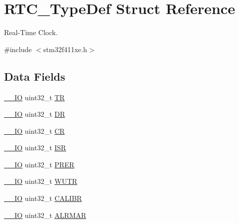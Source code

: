 \hypertarget{struct_r_t_c___type_def}{}\section{R\+T\+C\+\_\+\+Type\+Def Struct Reference}
\label{struct_r_t_c___type_def}


Real-\/\+Time Clock.  




{\ttfamily \#include $<$stm32f411xe.\+h$>$}

\subsection*{Data Fields}
\begin{DoxyCompactItemize}
\item 
\hyperlink{core__sc300_8h_aec43007d9998a0a0e01faede4133d6be}{\+\_\+\+\_\+\+IO} uint32\+\_\+t \hyperlink{struct_r_t_c___type_def_a2e8783857f8644a4eb80ebc51e1cba42}{TR}
\item 
\hyperlink{core__sc300_8h_aec43007d9998a0a0e01faede4133d6be}{\+\_\+\+\_\+\+IO} uint32\+\_\+t \hyperlink{struct_r_t_c___type_def_a8750eae683cb3d382476dc7cdcd92b96}{DR}
\item 
\hyperlink{core__sc300_8h_aec43007d9998a0a0e01faede4133d6be}{\+\_\+\+\_\+\+IO} uint32\+\_\+t \hyperlink{struct_r_t_c___type_def_a731d9209ce40dce6ea61fcc6f818c892}{CR}
\item 
\hyperlink{core__sc300_8h_aec43007d9998a0a0e01faede4133d6be}{\+\_\+\+\_\+\+IO} uint32\+\_\+t \hyperlink{struct_r_t_c___type_def_a5a7b104d80b48b5708b50cdc487d6a78}{I\+SR}
\item 
\hyperlink{core__sc300_8h_aec43007d9998a0a0e01faede4133d6be}{\+\_\+\+\_\+\+IO} uint32\+\_\+t \hyperlink{struct_r_t_c___type_def_a5f43a11e0873212f598e41db5f2dcf6a}{P\+R\+ER}
\item 
\hyperlink{core__sc300_8h_aec43007d9998a0a0e01faede4133d6be}{\+\_\+\+\_\+\+IO} uint32\+\_\+t \hyperlink{struct_r_t_c___type_def_ad93017bb0a778a2aad9cd71211fc770a}{W\+U\+TR}
\item 
\hyperlink{core__sc300_8h_aec43007d9998a0a0e01faede4133d6be}{\+\_\+\+\_\+\+IO} uint32\+\_\+t \hyperlink{struct_r_t_c___type_def_a2403d29b2bfffb734ebef6642c0d2724}{C\+A\+L\+I\+BR}
\item 
\hyperlink{core__sc300_8h_aec43007d9998a0a0e01faede4133d6be}{\+\_\+\+\_\+\+IO} uint32\+\_\+t \hyperlink{struct_r_t_c___type_def_ad7e54d5c5a4b9fd1e26aca85b1e36c7f}{A\+L\+R\+M\+AR}
\item 

\end{DoxyCompactItemize}
